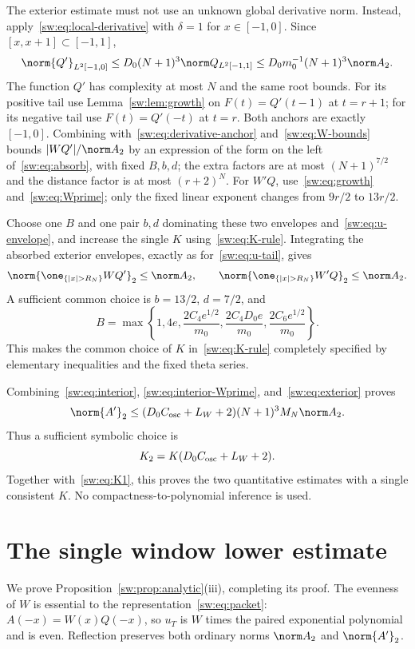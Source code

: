 \documentclass[11pt,a4paper]{article}
\numberwithin{equation}{section}
\theoremstyle{definition}\newtheorem{definition}[theorem]{Definition}
\theoremstyle{remark}\newtheorem{remark}[theorem]{Remark}
\begin{document}
The exterior estimate must not use an unknown global derivative norm. Instead, apply~\eqref{sw:eq:local-derivative} with $\delta=1$ for $x\in[-1,0]$. Since $[x,x+1]\subset[-1,1]$,
\begin{equation}\label{sw:eq:derivative-anchor}
 \norm{Q'}_{L^2[-1,0]}
 \le D_0(N+1)^3\norm Q_{L^2[-1,1]}
 \le D_0m_0^{-1}(N+1)^3\norm A_2.
\end{equation}
The function $Q'$ has complexity at most $N$ and the same root bounds. For its positive tail use Lemma~\ref{sw:lem:growth} on $F(t)=Q'(t-1)$ at $t=r+1$; for its negative tail use $F(t)=Q'(-t)$ at $t=r$. Both anchors are exactly $[-1,0]$. Combining with~\eqref{sw:eq:derivative-anchor} and~\eqref{sw:eq:W-bounds} bounds $|WQ'|/\norm A_2$ by an expression of the form on the left of~\eqref{sw:eq:absorb}, with fixed $B,b,d$; the extra factors are at most $(N+1)^{7/2}$ and the distance factor is at most $(r+2)^N$. For $W'Q$, use~\eqref{sw:eq:growth} and~\eqref{sw:eq:Wprime}; only the fixed linear exponent changes from $9r/2$ to $13r/2$.

Choose one $B$ and one pair $b,d$ dominating these two envelopes and~\eqref{sw:eq:u-envelope}, and increase the single $K$ using~\eqref{sw:eq:K-rule}. Integrating the absorbed exterior envelopes, exactly as for~\eqref{sw:eq:u-tail}, gives
\begin{equation}\label{sw:eq:exterior}
 \norm{\one_{\{|x|>R_N\}}WQ'}_2\le\norm A_2,
 \qquad
 \norm{\one_{\{|x|>R_N\}}W'Q}_2\le\norm A_2.
\end{equation}
A sufficient common choice is $b=13/2$, $d=7/2$, and
\begin{equation}\label{sw:eq:common-B}
 B=\max\left\{1,4e,\frac{2C_4e^{1/2}}{m_0},
                  \frac{2C_4D_0e}{m_0},\frac{2C_6e^{1/2}}{m_0}\right\}.
\end{equation}
This makes the common choice of $K$ in~\eqref{sw:eq:K-rule} completely specified by elementary inequalities and the fixed theta series.

Combining~\eqref{sw:eq:interior}, \eqref{sw:eq:interior-Wprime}, and~\eqref{sw:eq:exterior} proves
\[
 \norm{A'}_2\le (D_0C_{\rm osc}+L_W+2)(N+1)^3M_N\norm A_2.
\]
Thus a sufficient symbolic choice is
\begin{equation}\label{sw:eq:K2}
 K_2=K(D_0C_{\rm osc}+L_W+2).
\end{equation}
Together with~\eqref{sw:eq:K1}, this proves the two quantitative estimates with a single consistent $K$. No compactness-to-polynomial inference is used.

\section{The single window lower estimate}\label{sw:sec:carrier}
We prove Proposition~\ref{sw:prop:analytic}(iii), completing its proof. The evenness of $W$ is essential to the representation~\eqref{sw:eq:packet}: $A(-x)=W(x)Q(-x)$, so $u_T$ is $W$ times the paired exponential polynomial and is even. Reflection preserves both ordinary norms $\norm A_2$ and $\norm{A'}_2$.
\end{document}
